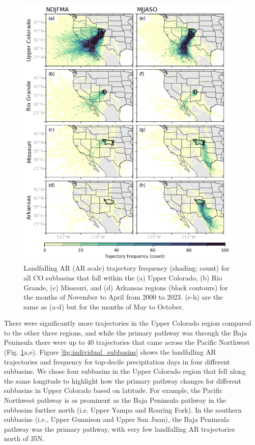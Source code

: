 \documentclass[draft]{agujournal2019}
\begin{document}
\begin{figure}
\noindent\includegraphics[width=\textwidth, height=\textheight, keepaspectratio]{fig5.png}
\caption{Landfalling AR (AR scale) trajectory frequency (shading; count) for all CO subbasins that fall within the (a) Upper Colorado, (b) Rio Grande, (c) Missouri, and (d) Arkansas regions (black contours) for the months of November to April from 2000 to 2023. (e-h) are the same as (a-d) but for the months of May to October.}
\label{fig:heatmaps}
\end{figure}

There were significantly more trajectories in the Upper Colorado region compared to the other three regions, and while the primary pathway was through the Baja Peninsula there were up to 40 trajectories that came across the Pacific Northwest (Fig. \ref{fig:heatmaps}a,e). Figure \ref{fig:individual_subbasins} shows the landfalling AR trajectories and frequency for top-decile precipitation days in four different subbasins. We chose four subbasins in the Upper Colorado region that fell along the same longitude to highlight how the primary pathway changes for different subbasins in Upper Colorado based on latitude. For example, the Pacific Northwest pathway is as prominent as the Baja Peninsula pathway in the subbasins further north (i.e. Upper Yampa and Roaring Fork). In the southern subbasins (i.e., Upper Gunnison and Upper San Juan), the Baja Peninsula pathway was the primary pathway, with very few landfalling AR trajectories north of 35\textdegree N. 
\end{document}
